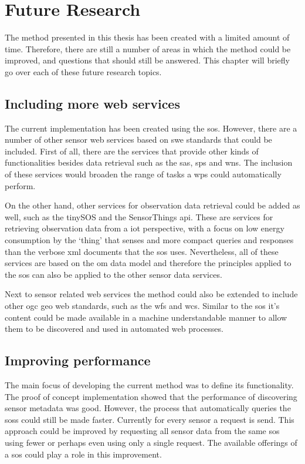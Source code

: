 
\chapter{Future Research}
\label{chap:futureResearch}

The method presented in this thesis has been created with a limited amount of time. Therefore, there are still a number of areas in which the method could be improved, and questions that should still be answered. This chapter will briefly go over each of these future research topics. 

\section*{Including more web services}
The current implementation has been created using the \ac{sos}. However, there are a number of other sensor web services based on \ac{swe} standards that could be included. First of all, there are the services that provide other kinds of functionalities besides data retrieval such as the \acf{sas}, \acf{sps} and \acf{wns}. The inclusion of these services would broaden the range of tasks a \ac{wps} could automatically perform. 

On the other hand, other services for observation data retrieval could be added as well, such as the tinySOS and the SensorThings \ac{api}. These are services for retrieving observation data from a \ac{iot} perspective, with a focus on low energy consumption by the `thing' that senses and more compact queries and responses than the verbose \ac{xml} documents that the \ac{sos} uses. Nevertheless, all of these services are based on the \ac{om} data model and therefore the principles applied to the \ac{sos} can also be applied to the other sensor data services.  

Next to sensor related web services the method could also be extended to include other \ac{ogc} geo web standards, such as the \acf{wfs} and \acf{wcs}. Similar to the \ac{sos} it's content could be made available in a machine understandable manner to allow them to be discovered and used in automated web processes.    

\section*{Improving performance}
The main focus of developing the current method was to define its functionality. The proof of concept implementation showed that the performance of discovering sensor metadata was good. However, the process that automatically queries the \aclp{sos} could still be made faster. Currently for every sensor a request is send. This approach could be improved by requesting all sensor data from the same \ac{sos} using fewer or perhaps even using only a single request. The available offerings of a \ac{sos} could play a role in this improvement.    

